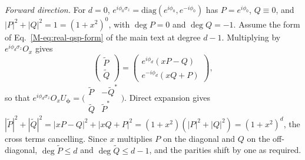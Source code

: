 \documentclass[
    reprint,
    amsmath,amssymb,
    aps,
    pra,
    superscriptaddress,
    floatfix
]{revtex4-2}
\theoremstyle{aps}
\newcommand{\PauliZ}{\sigma_z}
\begin{document}
\emph{Forward direction.}  For $d=0$,
$e^{i\phi_0\PauliZ}=\mathrm{diag}(e^{i\phi_0},e^{-i\phi_0})$ has
$P=e^{i\phi_0}$, $Q\equiv 0$, and $|P|^2+|Q|^2=1=(1+x^2)^0$, with
$\deg P=0$ and $\deg Q=-1$.  Assume the form of Eq.~\eqref{M-eq:real-qsp-form} of the main text
at degree $d-1$.  Multiplying by $e^{i\phi_d\PauliZ}O_x$ gives
\begin{equation}
	\begin{pmatrix}\widetilde P\\ \widetilde Q\end{pmatrix}
	=\begin{pmatrix} e^{i\phi_d}(xP-Q)\\ e^{-i\phi_d}(xQ+P)\end{pmatrix},
\end{equation}
so that $e^{i\phi_d\PauliZ}O_x U_{\bm\phi}=
\bigl(\begin{smallmatrix}\widetilde P&-\widetilde Q^*\\
\widetilde Q&\widetilde P^*\end{smallmatrix}\bigr)$.  Direct expansion
gives
$|\widetilde P|^2+|\widetilde Q|^2=|xP-Q|^2+|xQ+P|^2
=(1+x^2)(|P|^2+|Q|^2)=(1+x^2)^d$, the cross terms cancelling.  Since
$x$ multiplies $P$ on the diagonal and $Q$ on the off-diagonal,
$\deg\widetilde P\le d$ and $\deg\widetilde Q\le d-1$, and the
parities shift by one as required.
\end{document}
